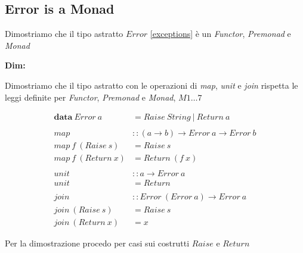 \label{proofs}

\subsection{Error is a Monad}
\label{Error_is_a_monad}
Dimostriamo che il tipo astratto $Error$ \ref{exceptions} è un
\textit{Functor}, \textit{Premonad} e \textit{Monad}\newline

\textbf{Dim:}\newline

Dimostriamo che il tipo astratto con le operazioni di \textit{map},
\textit{unit} e \textit{join} rispetta le leggi definite per \textit{Functor},
\textit{Premonad} e \textit{Monad}, $M1\dots7$

\begin{align*}
  \textbf{data}\ Error\ a &= Raise\ String\ |\ Return\ a \\\\
  map &:: (a \to b) \to Error\ a \to Error\ b\\
  map\ f\ (Raise\ s) &= Raise\ s\\
  map\ f\ (Return\ x) &= Return\ (f\ x)\\\\
  unit &:: a \to Error\ a\\
  unit &= Return\\\\
  join &:: Error\ (Error\ a) \to Error\ a\\
  join\ (Raise\ s) &= Raise\ s\\
  join\ (Return\ x) &= x
\end{align*}

Per la dimostrazione procedo per casi sui costrutti $Raise$ e $Return$

